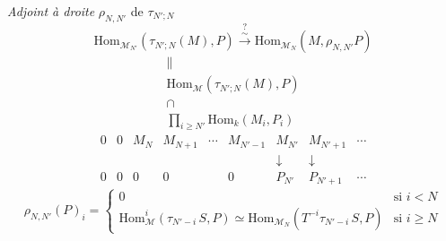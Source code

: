 \documentclass[11pt,a4paper]{article}
\begin{document}
\emph{Adjoint à droite} $\rho_{N,N'}$ de $\tau_{N';N}$
\[
  \mathrm{Hom}_{\mathcal{M}_{N'}}(\tau_{N';N}(M), P) \overset{?}{\xrightarrow{\ \sim\ }} \mathrm{Hom}_{\mathcal{M}_N}(M, \rho_{N,N'} P)
\]
\[
  \begin{array}{c}
    \| \\
    \mathrm{Hom}_{\mathcal{M}}(\tau_{N';N}(M), P) \\
    \cap \\
    \prod_{i \geq N'} \mathrm{Hom}_k(M_i, P_i)
  \end{array}
\]
\[
  \begin{array}{cccccccccc}
    0 & 0 & M_N & M_{N+1} & \cdots & M_{N'-1} & M_{N'} & M_{N'+1} & \cdots \\
      &   &     &         &        &          & \downarrow & \downarrow & \\
    0 & 0 & 0 & 0 &  & 0 & P_{N'} & P_{N'+1} & \cdots
  \end{array}
\]
\[
  \rho_{N,N'}(P)_i =
  \begin{cases}
    0 & \text{si } i < N \\
    \mathrm{Hom}^i_{\mathcal{M}}(\tau_{N'-i}\, S, P) \simeq \mathrm{Hom}_{\mathcal{M}_N}(T^{-i} \tau_{N'-i}\, S, P) & \text{si } i \geq N
  \end{cases}
\]
\end{document}
